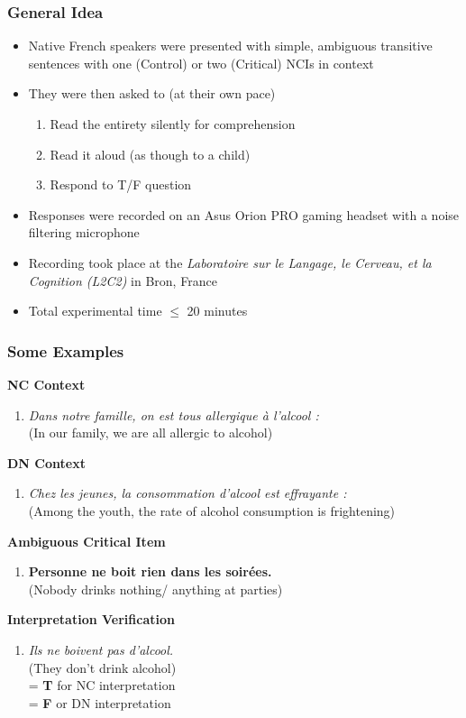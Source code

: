 \documentclass{beamer}
\newcounter{saveenumi}
\newcommand{\seti}{\setcounter{saveenumi}{\value{enumi}}}
\newcommand{\conti}{\setcounter{enumi}{\value{saveenumi}}}
\begin{document}
\begin{frame}
\frametitle{General Idea}
\begin{itemize}
\item Native French speakers were presented with simple, ambiguous transitive sentences with one (Control) or two (Critical) NCIs in context
\item They were then asked to (at their own pace)
\begin{enumerate}
\item Read the entirety silently for comprehension
\item Read it aloud (as though to a child)
\item Respond to T/F question 
\end{enumerate}
\item Responses were recorded on an Asus Orion PRO gaming headset with a noise filtering microphone
\item Recording took place at the \textit{Laboratoire sur le Langage, le Cerveau, et la Cognition (L2C2)} in Bron, France
\item Total experimental time $\leq$ 20 minutes
\end{itemize}
\end{frame}

\begin{frame}
\frametitle{Some Examples}
\textbf{NC Context}
\begin{enumerate}
\item \textit{Dans notre famille, on est tous allergique \`a l'alcool :}\\
(In our family, we are all allergic to alcohol)
\seti
\end{enumerate}
\textbf{DN Context}
\begin{enumerate}
\conti
\item \textit{Chez les jeunes, la consommation d'alcool est effrayante :}\\
(Among the youth, the rate of alcohol consumption is frightening)
\seti
\end{enumerate}
\textbf{Ambiguous Critical Item}
\begin{enumerate}
\conti
\item \alert{\textbf{Personne ne boit rien dans les soir\'ees.}}\\
(Nobody drinks nothing/ anything at parties)
\seti
\end{enumerate}
\textbf{Interpretation Verification}
\begin{enumerate}
\conti
\item \textit{Ils ne boivent pas d'alcool.}\\
(They don't drink alcohol)\\
= \textbf{T} for NC interpretation\\
= \textbf{F} or DN interpretation
\end{enumerate}
\end{frame}
\end{document}
